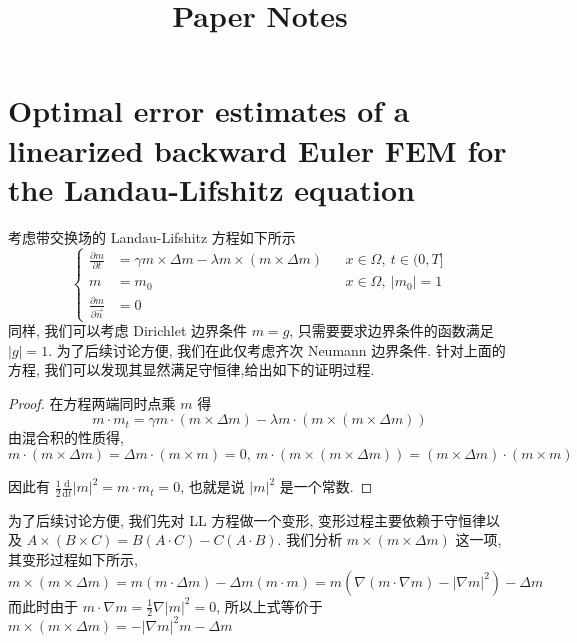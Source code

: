 \documentclass[UTF8,a4paper]{article}
\title{Paper Notes}
\begin{document}
\maketitle
\tableofcontents

\section{Optimal error estimates of a linearized backward Euler FEM for the Landau-Lifshitz equation}
考虑带交换场的 Landau-Lifshitz 方程如下所示
\begin{equation*}
\left\{\begin{aligned}
\frac{\partial m}{\partial t}&=\gamma m\times\Delta m-\lambda m\times(m\times\Delta m) &&x\in\Omega,\ t\in(0,T]\\ 
 m &=m_{0} &&x\in\Omega,\ \left| m_0 \right| =1\\ 
 \frac{\partial m}{\partial\vec{n}} &=0 &&
\end{aligned}\right.
\end{equation*}
同样, 我们可以考虑 Dirichlet 边界条件 $m=g$, 只需要要求边界条件的函数满足 $\left| g \right|=1$. 为了后续讨论方便, 我们在此仅考虑齐次 Neumann 边界条件. 针对上面的方程, 我们可以发现其显然满足守恒律,给出如下的证明过程.
\begin{proof}
  在方程两端同时点乘 $m$ 得
\begin{equation*}
m\cdot m_t=\gamma m\cdot(m\times\Delta m)-\lambda m\cdot ( m\times( m\times \Delta m))
\end{equation*}
由混合积的性质得, $m\cdot \left( m\times \Delta m\right)=\Delta m\cdot ( m\times  m)=0,\  m\cdot ( m\times ( m\times \Delta m))=( m\times\Delta m)\cdot ( m\times m)$

因此有 $\frac{1}{2}\frac{\mathrm{d}}{\mathrm{d}t}\left| m \right|^2=m\cdot m_t=0$, 也就是说 $\left| m \right|^2$ 是一个常数.
\end{proof}

为了后续讨论方便, 我们先对 LL 方程做一个变形, 变形过程主要依赖于守恒律以及 $A\times \left( B\times C\right)=B \left( A\cdot C\right)-C \left( A\cdot B\right)$. 我们分析 $m\times ( m\times \Delta m)$ 这一项, 其变形过程如下所示,
\begin{equation*}
m\times( m\times \Delta m)=m(m\cdot\Delta m)-\Delta m(m\cdot m)=m(\nabla(m\cdot\nabla m)-\left| \nabla m \right|^2)-\Delta m
\end{equation*}
而此时由于 $m\cdot\nabla m=\frac{1}{2}\nabla\left|  m\right|^2=0$, 所以上式等价于 $m\times( m\times \Delta m)=-\left| \nabla m \right|^2m-\Delta m$
\end{document}
